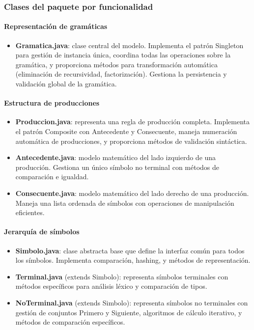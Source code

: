 \subsubsection{Clases del paquete por funcionalidad}

\paragraph{Representación de gramáticas}
\begin{itemize}
    \item \textbf{Gramatica.java}: clase central del modelo. Implementa el patrón Singleton para gestión de instancia única, coordina todas las operaciones sobre la gramática, y proporciona métodos para transformación automática (eliminación de recursividad, factorización). Gestiona la persistencia y validación global de la gramática.
\end{itemize}

\paragraph{Estructura de producciones}
\begin{itemize}
    \item \textbf{Produccion.java}: representa una regla de producción completa. Implementa el patrón Composite con Antecedente y Consecuente, maneja numeración automática de producciones, y proporciona métodos de validación sintáctica.

    \item \textbf{Antecedente.java}: modelo matemático del lado izquierdo de una producción. Gestiona un único símbolo no terminal con métodos de comparación e igualdad.

    \item \textbf{Consecuente.java}: modelo matemático del lado derecho de una producción. Maneja una lista ordenada de símbolos con operaciones de manipulación eficientes.
\end{itemize}

\paragraph{Jerarquía de símbolos}
\begin{itemize}
    \item \textbf{Simbolo.java}: clase abstracta base que define la interfaz común para todos los símbolos. Implementa comparación, hashing, y métodos de representación.

    \item \textbf{Terminal.java} (extends Simbolo): representa símbolos terminales con métodos específicos para análisis léxico y comparación de tipos.

    \item \textbf{NoTerminal.java} (extends Simbolo): representa símbolos no terminales con gestión de conjuntos Primero y Siguiente, algoritmos de cálculo iterativo, y métodos de comparación específicos.
\end{itemize}

